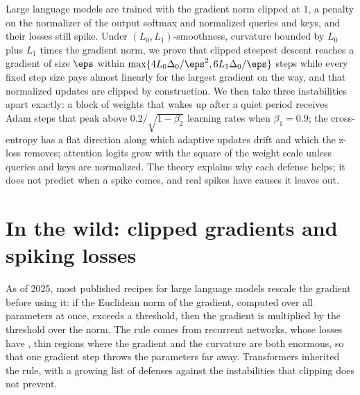 \newcommand{\spikescliff}{\Loss_{\mathrm{cliff}}}
\newcommand{\spikesplat}{\Loss_{\mathrm{plat}}}
\newcommand{\spikesclip}{\operatorname{clip}}
\newcommand{\spikesscript}[1]{\texttt{10-spikes-}\allowbreak\texttt{#1.py}}

\begin{refsection}

\begin{chaptersummary}
Large language models are trained with the gradient norm clipped at $1$, a penalty on the normalizer of the output softmax and normalized queries and keys, and their losses still spike. Under $(L_0,L_1)$-smoothness, curvature bounded by $L_0$ plus $L_1$ times the gradient norm, we prove that clipped steepest descent reaches a gradient of size $\eps$ within $\max\{4L_0\Delta_0/\eps^2,6L_1\Delta_0/\eps\}$ steps while every fixed step size pays almost linearly for the largest gradient on the way, and that normalized updates are clipped by construction. We then take three instabilities apart exactly: a block of weights that wakes up after a quiet period receives Adam steps that peak above $0.2/\sqrt{1-\beta_2}$ learning rates when $\beta_1=0.9$; the cross-entropy has a flat direction along which adaptive updates drift and which the z-loss removes; attention logits grow with the square of the weight scale unless queries and keys are normalized. The theory explains why each defense helps; it does not predict when a spike comes, and real spikes have causes it leaves out.
\end{chaptersummary}

\section{In the wild: clipped gradients and spiking losses}\label{sec:spikes:wild}

As of 2025, most published recipes for large language models rescale the gradient before using it: if the Euclidean norm of the gradient, computed over all parameters at once, exceeds a threshold, then the gradient is multiplied by the threshold over the norm. The rule comes from recurrent networks, whose losses have , thin regions where the gradient and the curvature are both enormous, so that one gradient step throws the parameters far away. Transformers inherited the rule, with a growing list of defenses against the instabilities that clipping does not prevent.


\end{refsection}
